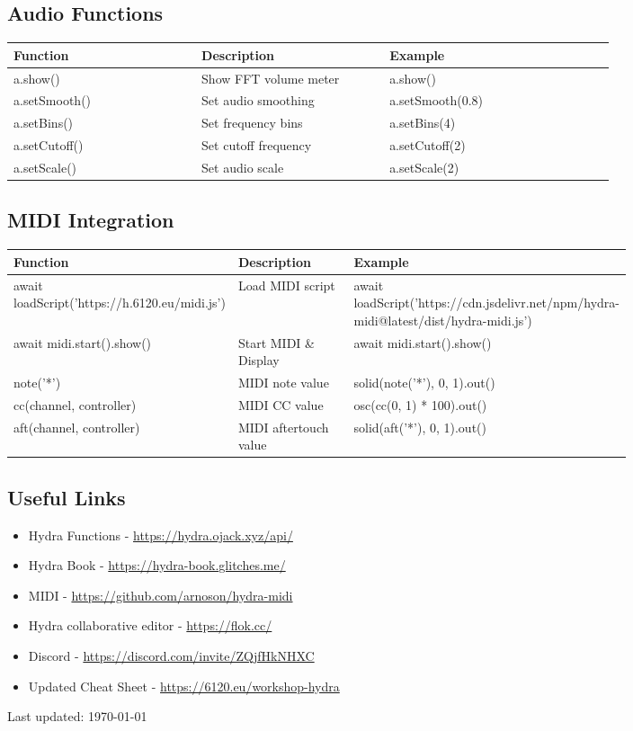 \documentclass[9pt,oneside]{amsart}
\begin{document}
\subsection*{Audio Functions}
\begin{tabular}{L{0.25\linewidth}L{0.25\linewidth}L{0.3\linewidth}}
\toprule
\textbf{Function} & \textbf{Description} & \textbf{Example} \\
\midrule
a.show() & Show FFT volume meter & a.show() \\
a.setSmooth() & Set audio smoothing & a.setSmooth(0.8) \\
a.setBins() & Set frequency bins & a.setBins(4) \\
a.setCutoff() & Set cutoff frequency & a.setCutoff(2) \\
a.setScale() & Set audio scale & a.setScale(2) \\
\bottomrule
\end{tabular}

\subsection*{MIDI Integration}
\begin{tabular}{L{0.25\linewidth}L{0.25\linewidth}L{0.3\linewidth}}
\toprule
\textbf{Function} & \textbf{Description} & \textbf{Example} \\
\midrule
await loadScript('https://h.6120.eu/midi.js') & Load MIDI script & await loadScript('https://cdn.jsdelivr.net/npm/hydra-midi@latest/dist/hydra-midi.js') \\
await midi.start().show() & Start MIDI \& Display & await midi.start().show() \\
note('*') & MIDI note value & solid(note('*'), 0, 1).out() \\
cc(channel, controller) & MIDI CC value & osc(cc(0, 1) * 100).out() \\
aft(channel, controller) & MIDI aftertouch value & solid(aft('*'), 0, 1).out() \\
\bottomrule
\end{tabular}

\subsection*{Useful Links}
\begin{itemize}
\item Hydra Functions - \url{https://hydra.ojack.xyz/api/}
\item Hydra Book - \url{https://hydra-book.glitches.me/}
\item MIDI - \url{https://github.com/arnoson/hydra-midi}
\item Hydra collaborative editor - \url{https://flok.cc/}
\item Discord - \url{https://discord.com/invite/ZQjfHkNHXC}
\item Updated Cheat Sheet - \url{https://6120.eu/workshop-hydra}
\end{itemize}

Last updated: \today
\end{document}
